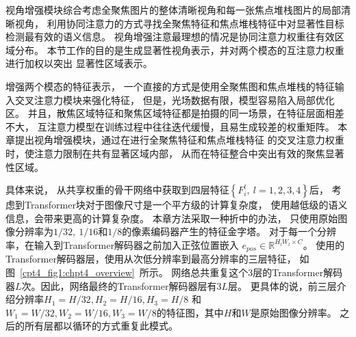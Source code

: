 视角增强模块综合考虑全聚焦图片的整体清晰视角和每一张焦点堆栈图片的局部清晰视角，
利用协同注意力的方式寻找全聚焦特征和焦点堆栈特征中对显著性目标检测最有效的语义信息。
视角增强注意最理想的情况是协同注意力权重往有效区域分布。
本节工作的目的是生成显著性视角表示，并对两个模态的互注意力权重进行加权以突出
显著性区域表示。


增强两个模态的特征表示，
一个直接的方式是使用全聚焦图和焦点堆栈的特征输入交叉注意力模块来强化特征，
但是，光场数据有限，模型容易陷入局部优化区。
并且，散焦区域特征和聚焦区域特征都是拍摄的同一场景，在特征层面相差不大，
互注意力模型在训练过程中往往迭代缓慢，且易生成较差的权重矩阵。
本章提出视角增强模块，通过在进行全聚焦特征和焦点堆栈特征
的交叉注意力权重时，使注意力限制在共有显著区域内部，
从而在特征整合中突出有效的聚焦显著性区域。


具体来说，
从共享权重的骨干网络中获取到四层特征$\left \{ F_{i}^{l},~l=1,2,3,4 \right \}$后，
考虑到Transformer块对于图像尺寸是一个平方级的计算复杂度，
使用越低级的语义信息，会带来更高的计算复杂度。
本章方法采取一种折中的办法，
只使用原始图像分辨率为$1/32,~1/16$和$1/8$的像素编码器产生的特征金字塔。
对于每一个分辨率，在输入到Transformer解码器之前加入正弦位置嵌入
$ e_{pos}\in \mathbb{R}^{H_{l}W_{l}\times C} $。
使用的Transformer解码器层，使用从次低分辨率到最高分辨率的三层特征，
如图~\ref{cpt4_fig1:chpt4_overview}~所示。
网络总共重复这个3层的Transformer解码器$L$次。因此，网络最终的Transformer解码器层有$3L$层。
更具体的说，前三层介绍分辨率$H_{1}=H/32,H_{2}=H/16,H_{3}=H/8$
和$W_{1}=W/32,W_{2}=W/16,W_{3}=W/8$的特征图，其中$H$和$W$是原始图像分辨率。
之后的所有层都以循环的方式重复此模式。



